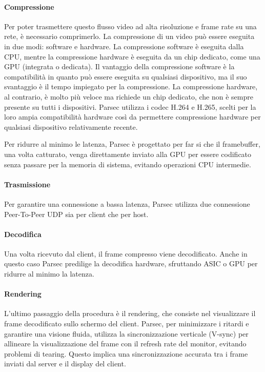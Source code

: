 \documentclass[12pt,a4paper,openright,twoside]{book}
\begin{document}
\paragraph{Compressione}
\label{sec:compressione}
Per poter trasmettere questo flusso video ad alta risoluzione e frame rate su una rete, è necessario comprimerlo.
La compressione di un video può essere eseguita in due modi: software e hardware.
%
La compressione software è eseguita dalla CPU, mentre la compressione hardware è eseguita da un chip dedicato, come una GPU (integrata o dedicata).
%
Il vantaggio della compressione software è la compatibilità in quanto può essere eseguita su qualsiasi dispositivo, ma il suo svantaggio è il tempo impiegato per la compressione.
La compressione hardware, al contrario, è molto più veloce ma richiede un chip dedicato, che non è sempre presente su tutti i dispositivi.
%
Parsec utilizza i codec H.264 e H.265, scelti per la loro ampia compatibilità hardware così da permettere compressione hardware per qualsiasi dispositivo relativamente recente.

Per ridurre al minimo le latenza, Parsec è progettato per far si che il framebuffer,
una volta catturato, venga direttamente inviato alla GPU per essere codificato senza passare per la memoria di sistema, evitando operazioni CPU intermedie.

\paragraph{Trasmissione}
Per garantire una connessione a bassa latenza, Parsec utilizza due connessione Peer-To-Peer UDP sia per client che per host.

\paragraph{Decodifica}
Una volta ricevuto dal client, il frame compresso viene decodificato. Anche in questo caso Parsec predilige la decodifica hardware, sfruttando ASIC o GPU per ridurre al minimo la latenza.

\paragraph{Rendering}
L'ultimo passaggio della procedura è il rendering, che consiste nel visualizzare il frame decodificato sullo schermo del client. Parsec, per minimizzare i ritardi e garantire una visione fluida, utilizza la sincronizzazione verticale (V-sync) per allineare la visualizzazione del frame con il refresh rate del monitor, evitando problemi di tearing. Questo implica una sincronizzazione accurata tra i frame inviati dal server e il display del client.
\end{document}
